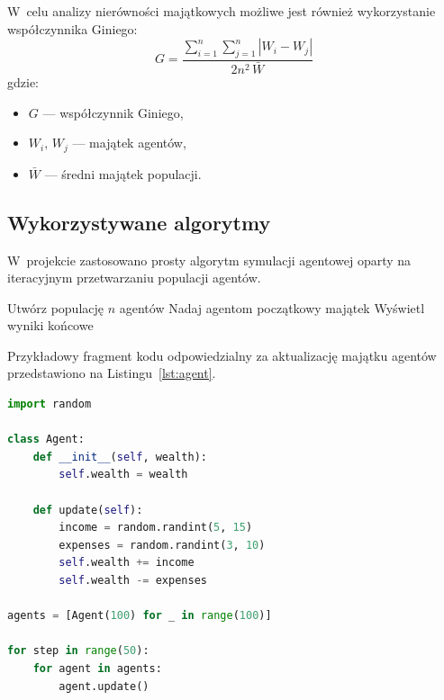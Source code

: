 \documentclass[polish]{projectreport}
\begin{document}
W~celu analizy nier\'owno\'sci maj\k{a}tkowych mo\.{z}liwe jest r\'ownie\.{z} wykorzystanie
wsp\'o\l{}czynnika Giniego:
\begin{equation}
  G = \frac{\displaystyle\sum_{i=1}^{n}\sum_{j=1}^{n} |W_i - W_j|}{2n^2\,\bar{W}}
\end{equation}
gdzie:
\begin{itemize}
  \item $G$ --- wsp\'o\l{}czynnik Giniego,
  \item $W_i,\, W_j$ --- maj\k{a}tek agent\'ow,
  \item $\bar{W}$ --- \'sredni maj\k{a}tek populacji.
\end{itemize}

\subsection{Wykorzystywane algorytmy}
\label{sec:algorithms}

W~projekcie zastosowano prosty algorytm symulacji agentowej oparty na iteracyjnym
przetwarzaniu populacji agentów. \\[1\baselineskip]

\begin{algorithm}[H]
\caption{Algorytm symulacji systemu spo\l{}eczno-ekonomicznego}
\label{alg:simulation}
Utw\'orz populacj\k{e} $n$ agent\'ow\;
Nadaj agentom pocz\k{a}tkowy maj\k{a}tek\;
Wy\'swietl wyniki ko\'ncowe\;
\end{algorithm}

Przyk\l{}adowy fragment kodu odpowiedzialny za aktualizacj\k{e} maj\k{a}tku agent\'ow
przedstawiono na Listingu~\ref{lst:agent}.

\clearpage
\begin{lstlisting}[language=Python, caption={Fragment kodu symulacji agentowej}, label={lst:agent}]
import random

class Agent:
    def __init__(self, wealth):
        self.wealth = wealth

    def update(self):
        income = random.randint(5, 15)
        expenses = random.randint(3, 10)
        self.wealth += income
        self.wealth -= expenses

agents = [Agent(100) for _ in range(100)]

for step in range(50):
    for agent in agents:
        agent.update()
\end{lstlisting}
\end{document}
